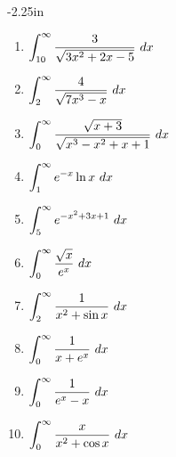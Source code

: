 \begin{adjustwidth*}{}{-2.25in}
\begin{multicols*}{2}
\begin{enumerate}[1),resume]
\item $\displaystyle \int_{10}^\infty \frac{3}{\sqrt{3x^2+2x-5}} \ dx$
\item $\displaystyle \int_{2}^\infty \frac{4}{\sqrt{7x^3-x}} \ dx$
\item $\displaystyle \int_{0}^\infty \frac{\sqrt{x+3}}{\sqrt{x^3-x^2+x+1}} \ dx$
\item $\ds \int_{1}^\infty e^{-x}\ln x \ dx$
\item $\ds \int_{5}^\infty e^{-x^2+3x+1} \ dx$
\item $\displaystyle \int_{0}^\infty \frac{\sqrt{x}}{e^x} \ dx$
\item $\displaystyle \int_{2}^\infty \frac{1}{x^2+\sin x} \ dx$
\item $\ds \int_{0}^\infty \frac{1}{x+e^x} \ dx$
\item $\ds \int_{0}^\infty \frac{1}{e^x-x} \ dx$
\item $\displaystyle \int_{0}^\infty \frac{x}{x^2+\cos x} \ dx$
\end{enumerate}

\end{multicols*}
\end{adjustwidth*}

%
%
%

\afterexercises